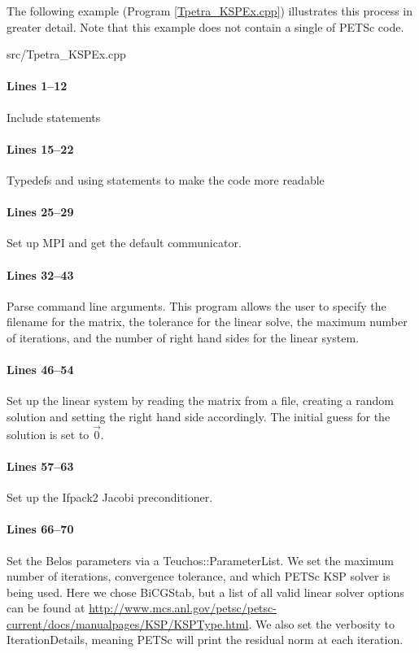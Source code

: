 The following example (Program \ref{Tpetra_KSPEx.cpp}) illustrates this process
in greater detail.  Note that this example does not contain a single of PETSc
code.

\begin{lstinputlisting}[caption=Tpetra\_KSPEx.cpp,label=Tpetra_KSPEx.cpp]{src/Tpetra_KSPEx.cpp}
\end{lstinputlisting}

\paragraph{Lines 1--12}
Include statements

\paragraph{Lines 15--22}
Typedefs and using statements to make the code more readable

\paragraph{Lines 25--29}
Set up MPI and get the default communicator.

\paragraph{Lines 32--43} 
Parse command line arguments.  This program allows the user to specify the
filename for the matrix, the tolerance for the linear solve, the maximum number
of iterations, and the number of right hand sides for the linear system.

\paragraph{Lines 46--54}
Set up the linear system by reading the matrix from a file, creating a
random solution and setting the right hand side accordingly.  The initial
guess for the solution is set to $\vec{0}$.

\paragraph{Lines 57--63}
Set up the Ifpack2 Jacobi preconditioner.

\paragraph{Lines 66--70}
Set the Belos parameters via a Teuchos::ParameterList. We set the maximum number
of iterations, convergence tolerance, and which PETSc KSP solver is being used. 
Here we chose BiCGStab, but a list of all valid linear solver options can be
found at \url{http://www.mcs.anl.gov/petsc/petsc-current/docs/manualpages/KSP/KSPType.html}.
We also set the verbosity to IterationDetails, meaning PETSc will print the
residual norm at each iteration.

